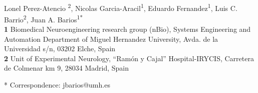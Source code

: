 \documentclass[10pt,letterpaper]{article}
\date{}
\begin{document}
\vspace*{0.2in}

\begin{flushleft}
{\Large
\textbf{} %
}
\newline
\\
Lonel Perez-Atencio \textsuperscript{2},
Nicolas Garcia-Aracil\textsuperscript{1},
Eduardo Fernandez\textsuperscript{1},
Luis C. Barrio\textsuperscript{2},
Juan A. Barios\textsuperscript{1*}
\\
\bigskip
\textbf{1} Biomedical Neuroengineering research group (nBio), Systems Engineering and Automation Department of Miguel Hernandez University, Avda. de la Universidad s/n, 03202 Elche, Spain
\\
\textbf{2} Unit of Experimental Neurology, “Ram\'on y Cajal” Hospital-IRYCIS, Carretera de Colmenar km 9, 28034 Madrid, Spain
\\
\bigskip

* Correspondence: jbarios@umh.es

\end{flushleft}
\end{document}
